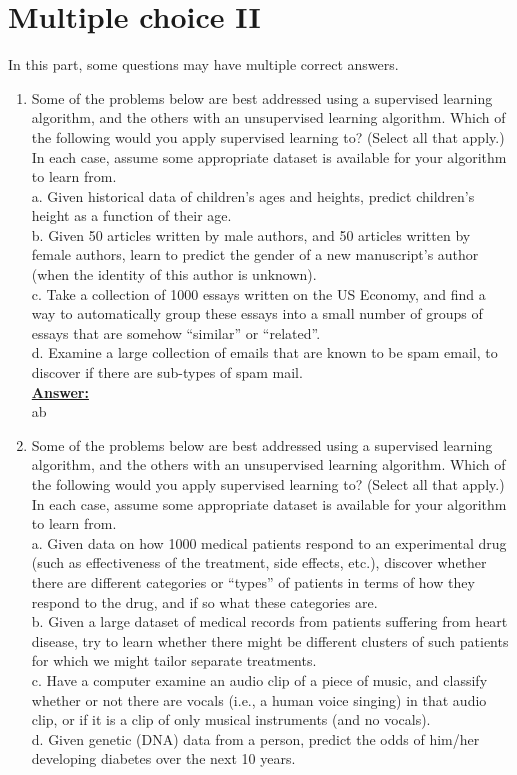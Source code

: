 \documentclass{article}
\newenvironment{qparts}{\begin{enumerate}[1.]}{\end{enumerate}}
\begin{document}
\section{Multiple choice II}
In this part, some questions may have multiple correct answers.
\begin{qparts}

 \item Some of the problems below are best addressed using a supervised learning algorithm, and the others with an unsupervised learning algorithm. Which of the following would you apply supervised learning to? (Select all that apply.) In each case, assume some appropriate dataset is available for your algorithm to learn from.\\
 a. Given historical data of children’s ages and heights, predict children’s height as a function of their age.\\
 b. Given 50 articles written by male authors, and 50 articles written by female authors, learn to predict the gender of a new manuscript’s author (when the identity of this author is unknown).\\
 c. Take a collection of 1000 essays written on the US Economy, and find a way to automatically group these essays into a small number of groups of essays that are somehow “similar” or “related”.\\
 d. Examine a large collection of emails that are known to be spam email, to discover if there are sub-types of spam mail.\\
 
\underline{\textbf{Answer:}}\\
ab

 \item Some of the problems below are best addressed using a supervised learning algorithm, and the others with an unsupervised learning algorithm. Which of the following would you apply supervised learning to? (Select all that apply.) In each case, assume some appropriate dataset is available for your algorithm to learn from.\\
a. Given data on how 1000 medical patients respond to an experimental drug (such as effectiveness of the treatment, side effects, etc.), discover whether there are different categories or “types” of patients in terms of how they respond to the drug, and if so what these categories are.\\
b. Given a large dataset of medical records from patients suffering from heart disease, try to learn whether there might be different clusters of such patients for which we might tailor separate treatments.\\
c. Have a computer examine an audio clip of a piece of music, and classify whether or not there are vocals (i.e., a human voice singing) in that audio clip, or if it is a clip of only musical instruments (and no vocals).\\
d. Given genetic (DNA) data from a person, predict the odds of him/her developing diabetes over the next 10 years.\\
 

\end{qparts}
\end{document}
